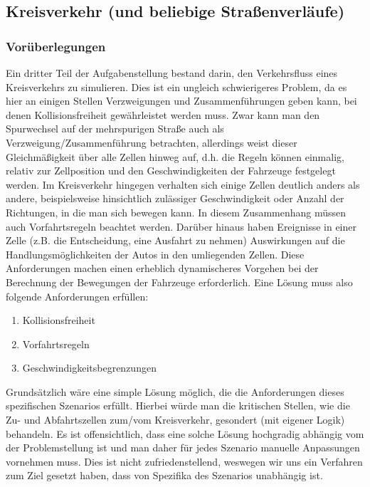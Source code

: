 \documentclass[10pt, a4paper]{article}
\begin{document}
\subsection{Kreisverkehr (und beliebige Straßenverläufe)}
\label{subsec:umsetzung-kreisverkehr}

\subsubsection{Vorüberlegungen}
\label{subsubsec:kreisverkehrUmsetzungVorueberlegungen}

Ein dritter Teil der Aufgabenstellung bestand darin, den Verkehrsfluss eines Kreisverkehrs zu simulieren. Dies ist ein ungleich schwierigeres Problem, da es hier an einigen Stellen Verzweigungen und Zusammenführungen geben kann, bei denen Kollisionsfreiheit gewährleistet werden muss. Zwar kann man den Spurwechsel auf der mehrspurigen Straße auch als Verzweigung/Zusammenführung betrachten, allerdings weist dieser Gleichmäßigkeit über alle Zellen hinweg auf, d.h. die Regeln können einmalig, relativ zur Zellposition und den Geschwindigkeiten der Fahrzeuge festgelegt werden. Im Kreisverkehr hingegen verhalten sich einige Zellen deutlich anders als andere, beispielsweise hinsichtlich zulässiger Geschwindigkeit oder Anzahl der Richtungen, in die man sich bewegen kann. In diesem Zusammenhang müssen auch Vorfahrtsregeln beachtet werden. Darüber hinaus haben Ereignisse in einer Zelle (z.B. die Entscheidung, eine Ausfahrt zu nehmen) Auswirkungen auf die Handlungsmöglichkeiten der Autos in den umliegenden Zellen. Diese Anforderungen machen einen erheblich dynamischeres Vorgehen bei der Berechnung der Bewegungen der Fahrzeuge erforderlich. Eine Lösung muss also folgende Anforderungen erfüllen:

\begin{enumerate}
	\item Kollisionsfreiheit
	\item Vorfahrtsregeln
	\item Geschwindigkeitsbegrenzungen
\end{enumerate}

Grundsätzlich wäre eine simple Lösung möglich, die die Anforderungen dieses spezifischen Szenarios erfüllt. Hierbei würde man die kritischen Stellen, wie die Zu- und Abfahrtszellen zum/vom Kreisverkehr, gesondert (mit eigener Logik) behandeln. Es ist offensichtlich, dass eine solche Lösung hochgradig abhängig vom der Problemstellung ist und man daher für jedes Szenario manuelle Anpassungen vornehmen muss. Dies ist nicht zufriedenstellend, weswegen wir uns ein Verfahren zum Ziel gesetzt haben, dass von Spezifika des Szenarios unabhängig ist.
\end{document}
